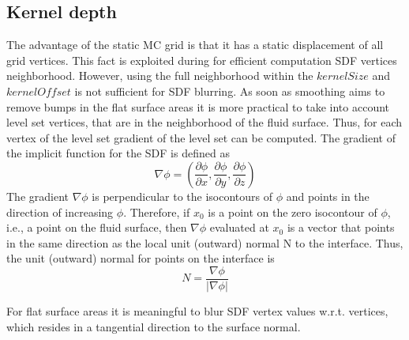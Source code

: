 \subsection{Kernel depth}
The advantage of the static MC grid is that it has a static displacement of all grid vertices. This fact is exploited during for efficient computation SDF vertices neighborhood. However, using the full neighborhood within the $kernelSize$ and $kernelOffset$ is not sufficient for SDF blurring. As soon as smoothing aims to remove bumps in the flat surface areas it is more practical to take into account level set vertices, that are in the neighborhood of the fluid surface. Thus, for each vertex of the level set gradient of the level set can be computed.
The gradient of the implicit function for the SDF is defined as
\begin{equation}
	\nabla\phi = \left( \dfrac{\partial\phi}{\partial x}, \dfrac{\partial\phi}{\partial y}, \dfrac{\partial\phi}{\partial z}\right)
\end{equation}
The gradient $\nabla\phi$ is perpendicular to the isocontours of $\phi$ and points in the
direction of increasing $\phi$. Therefore, if $x_0$ is a point on the zero isocontour
of $\phi$, i.e., a point on the fluid surface, then $\nabla\phi$ evaluated at $x_0$ is a vector that points in the same direction as the local unit (outward) normal N to the interface. Thus, the unit (outward) normal for points on the interface is \cite{LevelSetMethods}
\begin{equation}
	N = \dfrac{\nabla\phi}{|\nabla \phi|}
\end{equation}

For flat surface areas it is meaningful to blur SDF vertex values w.r.t. vertices, which resides in a tangential direction to the surface normal.

